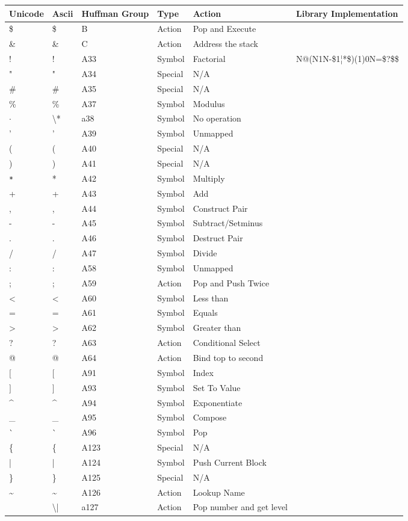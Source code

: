 \documentclass{article}
\makeatletter
\newcommand\escape\textbackslash
\newcommand{\at}{\makeatletter @\makeatother}
\makeatother
\begin{document}
\begin{tabular}{| >{\ttfamily}l| >{\ttfamily}l| >{\ttfamily}l|l|l| >{\ttfamily}l|}
    \hline
    \textbf{Unicode} & \textbf{Ascii} & \textbf{Huffman Group} & \textbf{Type} & \textbf{Action} & \textbf{Library Implementation}\\
    \hline
    \$ & \$ & B & Action & Pop and Execute & \\
    \& & \& & C & Action & Address the stack & \\
    ! & ! & A33 & Symbol & Factorial & {N@(N1N-\$1¦*\$)(1)0N=\$?\$}\$\\
    " & " & A34 & Special & N/A & \\
    \# & \# & A35 & Special & N/A & \\
    \% & \% & A37 & Symbol & Modulus & \\
    $\cdot$ & \escape{*} & a38 & Symbol & No operation & \\
    ' & ' & A39 & Symbol & Unmapped &\\
    ( & ( & A40 & Special & N/A & \\
    ) & ) & A41 & Special & N/A & \\
    \texttt{*} & * & A42 & Symbol & Multiply & \\
    + & + & A43 & Symbol & Add & \\
    , & , & A44 & Symbol & Construct Pair & \\
    - & - & A45 & Symbol & Subtract/Setminus & \\
    . & . & A46 & Symbol & Destruct Pair & \\
    / & / & A47 & Symbol & Divide & \\
    : & : & A58 & Symbol & Unmapped & \\
    ; & ; & A59 & Action & Pop and Push Twice & \\
    < & < & A60 & Symbol & Less than & \\
    = & = & A61 & Symbol & Equals & \\
    > & > & A62 & Symbol & Greater than & \\
    ? & ? & A63 & Action & Conditional Select & \\
    \at & \at & A64 & Action & Bind top to second & \\
    $[$ & $[$ & A91 & Symbol & Index & \\
    $]$ & $]$ & A93 & Symbol & Set To Value & \\
    \^{} & \^{} & A94 & Symbol & Exponentiate & \\
    \_ & \_ & A95 & Symbol & Compose & \\
    \`{} & \`{} & A96 & Symbol & Pop & \\
    \{ & \{ & A123 & Special & N/A & \\
    | & | & A124 & Symbol & Push Current Block &\\
    \} & \} & A125 & Special & N/A & \\
    \textasciitilde & \textasciitilde & A126 & Action & Lookup Name\\
    \textbrokenbar{} & \escape{|} & a127 & Action & Pop number and get level &\\ 
    \hline
\end{tabular}
\end{document}
